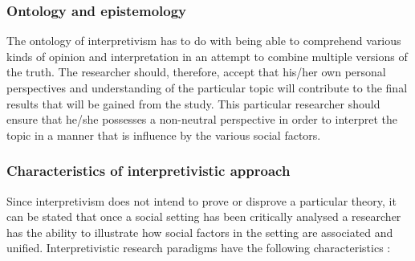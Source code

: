 \subsubsection{Ontology and epistemology}
The ontology of interpretivism has to do with being able to comprehend various kinds of opinion and interpretation in an attempt to combine multiple versions of the truth. The researcher should, therefore, accept that his/her own personal perspectives and understanding of the particular topic will contribute to the final results that will be gained from the study.  This particular researcher should ensure that he/she possesses a non-neutral perspective in order to interpret the topic in a manner that is influence by the various social factors.
\subsubsection{Characteristics of interpretivistic approach}
Since interpretivism does not intend to prove or disprove a particular theory, it can be stated that once a social setting has been critically analysed a researcher has the ability to illustrate how social factors in the setting are associated and unified. Interpretivistic research paradigms have the following characteristics \citep{OatesJ2006}: 

